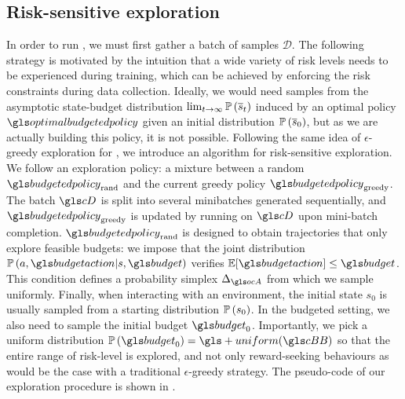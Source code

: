 \subsection{Risk-sensitive exploration}
\label{sec:exploration}

In order to run , we must first gather a batch of samples $\mathcal{D}$. The following strategy is motivated by the intuition that a wide variety of risk levels needs to be experienced during training, which can be achieved by enforcing the risk constraints during data collection. Ideally, we would need samples from the asymptotic state-budget distribution $\lim_{t\rightarrow\infty}\mathbb{P}\left(\overline{s}_t\right)$ induced by an optimal policy $\optimalbudgetedpolicy$ given an initial distribution $\mathbb{P}\left(\overline{s}_0\right)$, but as we are actually building this policy, it is not possible. Following the same idea of $\epsilon$-greedy exploration for \FTQ, we introduce an algorithm for risk-sensitive exploration. We follow an exploration policy: a mixture between a random  $\budgetedpolicy_\text{rand}$ and the current greedy policy $\budgetedpolicy_\text{greedy}$. The batch $\cD$ is split into several minibatches generated sequentially, and $\budgetedpolicy_\text{greedy}$ is updated by running  on $\cD$ upon mini-batch completion. $\budgetedpolicy_\text{rand}$ is designed to obtain trajectories that only explore feasible budgets: we impose that the joint distribution $\probability{a, \budgetaction|s, \budget}$ verifies $\expectedvalue[\budgetaction]\leq\budget$. This condition defines a probability simplex $\Delta_{\ocA}$ from which we sample uniformly. Finally, when interacting with an environment, the initial state $s_0$ is usually sampled from a starting distribution $\mathbb{P}\left(s_0\right)$. In the budgeted setting, we also need to sample the initial budget $\budget_0$. Importantly, we pick a uniform distribution $\probability{\budget_0} = \gls+{uniform}(\budgetspace)$ so that the entire range of risk-level is explored, and not only reward-seeking behaviours as would be the case with a traditional  $\epsilon$-greedy strategy. The pseudo-code of our exploration procedure is shown in .%



